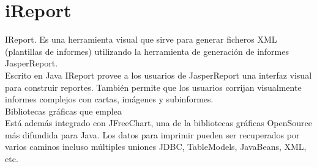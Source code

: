 	
	
	\section{iReport}
	\noindent IReport. Es una herramienta visual que sirve para generar ficheros XML (plantillas de informes) utilizando la herramienta de generación de informes JasperReport.\\
	\noindent Escrito en Java IReport provee a los usuarios de JasperReport una interfaz visual para construir reportes. También permite que los usuarios corrijan visualmente informes complejos con cartas, imágenes y subinformes. \\
	Bibliotecas gráficas que emplea \\
	\noindent Está además integrado con JFreeChart, una de la bibliotecas gráficas OpenSource más difundida para Java. Los datos para imprimir pueden ser recuperados por varios caminos incluso múltiples uniones JDBC, TableModels, JavaBeans, XML, etc. \\
	
